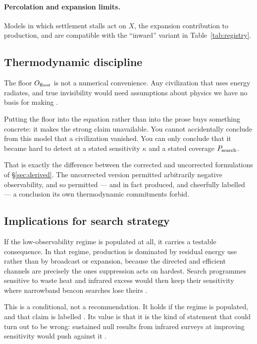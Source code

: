 \paragraph{Percolation and expansion limits.} Models in which settlement stalls
\citep{landis1998,forgan2009,armstrong2013} act on $X$, the expansion
contribution to production, and are compatible with the ``inward'' variant in
Table~\ref{tab:registry}.

\subsection{Thermodynamic discipline}

The floor $O_{\mathrm{floor}}$ is not a numerical convenience. Any civilization that uses
energy radiates, and true invisibility would need assumptions about physics we
have no basis for making \citep{dyson1960,kardashev1964}.

Putting the floor into the equation rather than into the prose buys something
concrete: it makes the strong claim unavailable. You cannot accidentally
conclude from this model that a civilization vanished. You can only conclude that
it became hard to detect at a stated sensitivity $\kappa$ and a stated coverage
$P_{\mathrm{search}}$. \Established

That is exactly the difference between the corrected and uncorrected
formulations of \S\ref{sec:derived}. The uncorrected version permitted
arbitrarily negative observability, and so permitted --- and in fact produced,
and cheerfully labelled --- a conclusion its own thermodynamic commitments
forbid.

\subsection{Implications for search strategy}

If the low-observability regime is populated at all, it carries a testable
consequence. In that regime, production is dominated by residual energy use
rather than by broadcast or expansion, because the directed and efficient
channels are precisely the ones suppression acts on hardest. Search programmes
sensitive to waste heat and infrared excess would then keep their sensitivity
where narrowband beacon searches lose theirs
\citep{dyson1960,wright2014ghat,garrett2015}.

This is a conditional, not a recommendation. It holds if the regime is
populated, and that claim is labelled \Hypothetical. Its value is that it is the
kind of statement that could turn out to be wrong: sustained null results from
infrared surveys at improving sensitivity would push against it
\citep{griffith2015,wright2022haystack}.

